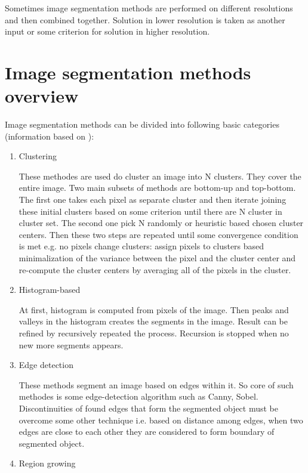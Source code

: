 Sometimes image segmentation methods are performed on different resolutions and then combined together.
Solution in lower resolution is taken as another input or some criterion for solution in higher resolution.

\section{Image segmentation methods overview}

Image segmentation methods can be divided into following basic categories (information based on \cite{wiki}):

\begin{enumerate}

  \item Clustering

  These methodes are used do cluster an image into N clusters.
They cover the entire image.
Two main subsets of methods are bottom-up and top-bottom.
The first one takes each pixel as separate cluster and then iterate joining these initial clusters based on some criterion until there are N cluster in cluster set.
The second one pick N randomly or heuristic based chosen cluster centers.
Then these two steps are repeated until some convergence condition is met e.g. no pixels change clusters: assign pixels to clusters based minimalization of the variance between the pixel and the cluster center and re-compute the cluster centers by averaging all of the pixels in the cluster.

  \item Histogram-based

  At first, histogram is computed from pixels of the image.
Then peaks and valleys in the histogram creates the segments in the image.
Result can be refined by recursively repeated the process.
Recursion is stopped when no new more segments appears.

  \item Edge detection

  These methods segment an image based on edges within it.
So core of such methodes is some edge-detection algorithm such as Canny, Sobel.
Discontinuities of found edges that form the segmented object must be overcome some other technique i.e. based on distance among edges, when two edges are close to each other they are considered to form boundary of segmented object.

  \item Region growing


\end{enumerate}
